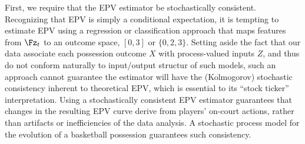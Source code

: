 \documentclass[EPV_JASA.tex]{subfiles}
\begin{document}
First, we require that the EPV estimator be stochastically consistent. Recognizing that EPV is simply a conditional expectation, it is tempting to estimate EPV using a regression or classification approach that maps features from $\Fz_t$ to an outcome space, $[0, 3]$ or $\{0, 2, 3\}$. Setting aside the fact that our data associate each possession outcome $X$ with process-valued inputs $Z$, and thus do not conform naturally to input/output structur of such models, such an approach cannot guarantee the estimator will have the (Kolmogorov) stochastic consistency inherent to theoretical EPV, which is essential to its ``stock ticker'' interpretation. Using a stochastically consistent EPV estimator guarantees that changes in the resulting EPV curve derive from players' on-court actions, rather than artifacts or inefficiencies of the data analysis.
A stochastic process model for the evolution of a basketball possession guarantees such consistency.
\end{document}
